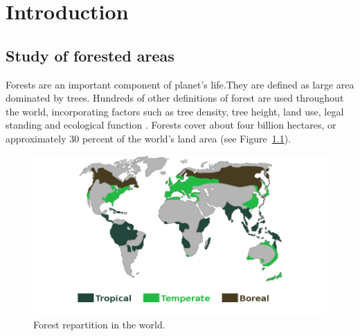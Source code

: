 
\chapter{Introduction} %
\label{Introduction} %


\startcontents[chapters]
\Mprintcontents





\section{Study of forested areas}
Forests are an important component of planet's life.They are defined as large area dominated by trees. Hundreds of other definitions of forest are used throughout the world, incorporating factors such as tree density, tree height, land use, legal standing and ecological function \citep{schuck2002compilation,achard2009vital}. Forests cover about four billion hectares, or approximately 30 percent of the world's land area (see Figure~\ref{fig:forest_in_world}).

\begin{figure}[htbp]
\begin{center}
\includegraphics[width=\textwidth]{Figures/forest_in_world}
\caption{Forest repartition in the world.}
\label{fig:forest_in_world}
\end{center}
\end{figure}


